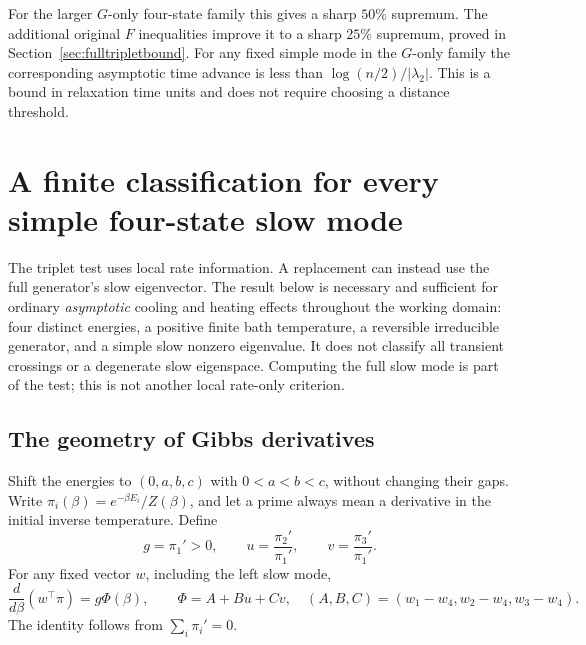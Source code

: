 \documentclass[11pt]{article}
\begin{document}
For the larger $G$-only four-state family this gives a sharp $50\%$ supremum.
The additional original $F$ inequalities improve it to a sharp $25\%$
supremum, proved in Section~\ref{sec:fulltripletbound}. For any fixed simple
mode in the $G$-only family the corresponding asymptotic time
advance is less than $\log(n/2)/|\lambda_2|$. This is a bound in relaxation
time units and does not require choosing a distance threshold.

\section{A finite classification for every simple four-state slow mode}\label{sec:universal}
The triplet test uses local rate information. A replacement can instead use the
full generator's slow eigenvector. The result below is necessary and sufficient
for ordinary \emph{asymptotic} cooling and heating effects throughout the working
domain: four distinct energies, a positive finite bath temperature, a reversible
irreducible generator, and a simple slow nonzero eigenvalue. It does not classify
all transient crossings or a degenerate slow eigenspace. Computing the full slow
mode is part of the test; this is not another local rate-only criterion.

\subsection{The geometry of Gibbs derivatives}
Shift the energies to $(0,a,b,c)$ with $0<a<b<c$, without changing their gaps.
Write $\pi_i(\beta)=e^{-\beta E_i}/Z(\beta)$, and let a prime always mean a
derivative in the initial inverse temperature. Define
\[
g=\pi_1'>0,\qquad u=\frac{\pi_2'}{\pi_1'},\qquad
v=\frac{\pi_3'}{\pi_1'}.
\]
For any fixed vector $w$, including the left slow mode,
\begin{equation}\label{eq:finitephi}
\frac{d}{d\beta}(w^\top\pi)=g\Phi(\beta),\qquad
\Phi=A+Bu+Cv,\quad (A,B,C)=(w_1-w_4,w_2-w_4,w_3-w_4).
\end{equation}
The identity follows from $\sum_i\pi_i'=0$.
\end{document}
